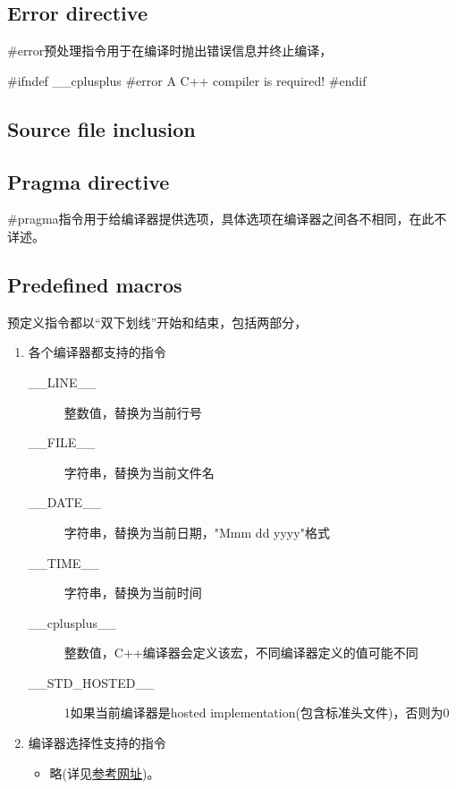 \subsection[\#error]{Error directive}
\#error预处理指令用于在编译时抛出错误信息并终止编译，

\begin{cppcode}
#ifndef __cplusplus
#error A C++ compiler is required!
#endif
\end{cppcode}

\subsection[\#include]{Source file inclusion}

\subsection[\#pragma]{Pragma directive}
\#pragma指令用于给编译器提供选项，具体选项在编译器之间各不相同，在此不详述。

\subsection[Predefined macros]{Predefined macros}
预定义指令都以“双下划线”开始和结束，包括两部分，
\begin{enumerate}
  \item 各个编译器都支持的指令
  \begin{description}
    \item[\_\_LINE\_\_] 整数值，替换为当前行号
    \item[\_\_FILE\_\_] 字符串，替换为当前文件名
    \item[\_\_DATE\_\_] 字符串，替换为当前日期，"Mmm dd yyyy"格式
    \item[\_\_TIME\_\_] 字符串，替换为当前时间
    \item[\_\_cplusplus\_\_] 整数值，C++编译器会定义该宏，不同编译器定义的值可能不同
    \item[\_\_STD\_HOSTED\_\_] 1如果当前编译器是hosted implementation(包含标准头文件)，否则为0
  \end{description}
  \item 编译器选择性支持的指令
  \begin{itemize}
    \item 略(详见\href{http://www.cplusplus.com/doc/tutorial/preprocessor/}{参考网址})。
  \end{itemize}
\end{enumerate}

